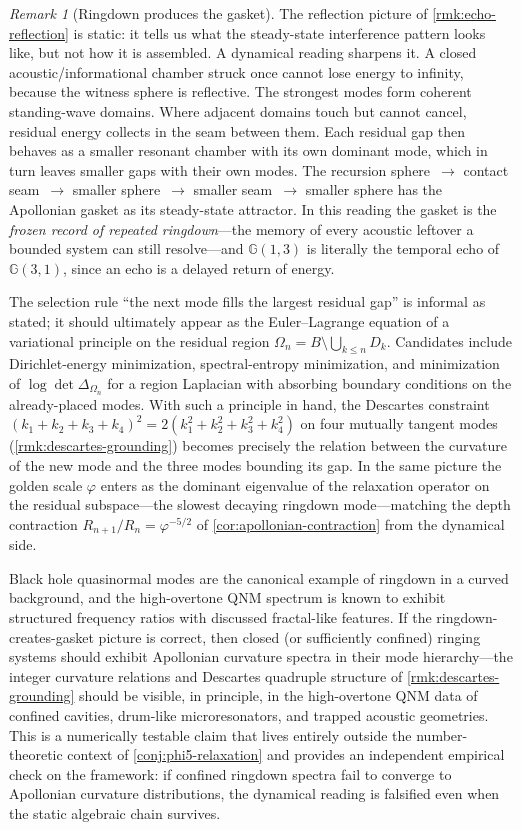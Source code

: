 \documentclass[11pt,a4paper]{article}
\theoremstyle{plain}
\theoremstyle{definition}
\theoremstyle{remark}
\newtheorem{remark}[theorem]{Remark}
\numberwithin{equation}{section}
\newcommand{\Cl}{\mathbb{G}}
\newcommand{\vp}{\varphi}
\begin{document}
\begin{remark}[Ringdown produces the gasket]
\label{rmk:ringdown-produces-gasket}
The reflection picture of \cref{rmk:echo-reflection} is static: it tells
us what the steady-state interference pattern looks like, but not how
it is assembled.  A dynamical reading sharpens it.  A closed
acoustic/informational chamber struck once cannot lose energy to
infinity, because the witness sphere is reflective.  The strongest
modes form coherent standing-wave domains.  Where adjacent domains touch
but cannot cancel, residual energy collects in the seam between them.
Each residual gap then behaves as a smaller resonant chamber with its
own dominant mode, which in turn leaves smaller gaps with their own
modes.  The recursion sphere~\(\to\) contact seam~\(\to\) smaller
sphere~\(\to\) smaller seam~\(\to\) smaller sphere has the Apollonian
gasket as its steady-state attractor.  In this reading the gasket is
the \emph{frozen record of repeated ringdown}---the memory of every
acoustic leftover a bounded system can still resolve---and \(\Cl(1,3)\)
is literally the temporal echo of \(\Cl(3,1)\), since an echo is a
delayed return of energy.

The selection rule ``the next mode fills the largest residual gap'' is
informal as stated; it should ultimately appear as the Euler--Lagrange
equation of a variational principle on the residual region
\(\Omega_n=B\setminus\bigcup_{k\le n}D_k\).  Candidates include
Dirichlet-energy minimization, spectral-entropy minimization, and
minimization of \(\log\det\Delta_{\Omega_n}\) for a region Laplacian
with absorbing boundary conditions on the already-placed modes.  With
such a principle in hand, the Descartes constraint
\((k_1+k_2+k_3+k_4)^2=2(k_1^2+k_2^2+k_3^2+k_4^2)\) on four mutually
tangent modes (\cref{rmk:descartes-grounding}) becomes precisely the
relation between the curvature of the new mode and the three modes
bounding its gap.  In the same picture the golden scale \(\vp\) enters
as the dominant eigenvalue of the relaxation operator on the residual
subspace---the slowest decaying ringdown mode---matching the depth
contraction \(R_{n+1}/R_n=\vp^{-5/2}\) of
\cref{cor:apollonian-contraction} from the dynamical side.

Black hole quasinormal modes are the canonical example of ringdown in
a curved background, and the high-overtone QNM spectrum is known to
exhibit structured frequency ratios with discussed fractal-like
features.  If the ringdown-creates-gasket picture
is correct, then closed (or sufficiently confined) ringing systems
should exhibit Apollonian curvature spectra in their mode
hierarchy---the integer curvature relations and Descartes quadruple
structure of \cref{rmk:descartes-grounding} should be visible, in
principle, in the high-overtone QNM data of confined cavities,
drum-like microresonators, and trapped acoustic geometries.  This is a
numerically testable claim that lives entirely outside the
number-theoretic context of \cref{conj:phi5-relaxation} and provides
an independent empirical check on the framework: if confined ringdown
spectra fail to converge to Apollonian curvature distributions, the
dynamical reading is falsified even when the static algebraic chain
survives.
\end{remark}
\end{document}
